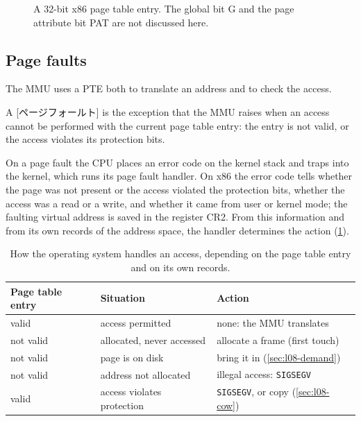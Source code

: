 \documentclass[../main.tex]{subfiles}
\begin{document}
\begin{figure}[htbp]
  \centering
  
  \caption{A 32-bit x86 page table entry.  The global bit G and the page
    attribute bit PAT are not discussed here.}
  \label{fig:l08-pte}
\end{figure}

\subsection{Page faults}
\label{sec:l08-page-fault}

The MMU uses a PTE both to translate an address and to check the
access.

\begin{definition}
  A [ページフォールト] is the exception that the MMU
  raises when an access cannot be performed with the current page table
  entry: the entry is not valid, or the access violates its protection
  bits.
\end{definition}

On a page fault the CPU places an error code on the kernel stack and traps
into the kernel, which runs its page fault handler.  On x86 the error code
tells whether the page was not present or the access violated the
protection bits, whether the access was a read or a write, and whether it
came from user or kernel mode; the faulting virtual address is saved in
the register CR2.  From this information and from its own records of the
address space, the handler determines the action (\cref{tab:l08-faults}).

\begin{table}[htbp]
  \centering
  \caption{How the operating system handles an access, depending on the
    page table entry and on its own records.}
  \label{tab:l08-faults}
  \small
  \begin{tabular}{@{}lll@{}}
    \toprule
    Page table entry & Situation & Action \\
    \midrule
    valid          & access permitted              & none: the MMU translates \\
    not valid      & allocated, never accessed     & allocate a frame (first touch) \\
    not valid      & page is on disk               & bring it in (\cref{sec:l08-demand}) \\
    not valid      & address not allocated         & illegal access: \texttt{SIGSEGV} \\
    valid          & access violates protection    & \texttt{SIGSEGV}, or copy (\cref{sec:l08-cow}) \\
    \bottomrule
  \end{tabular}
\end{table}
\end{document}
